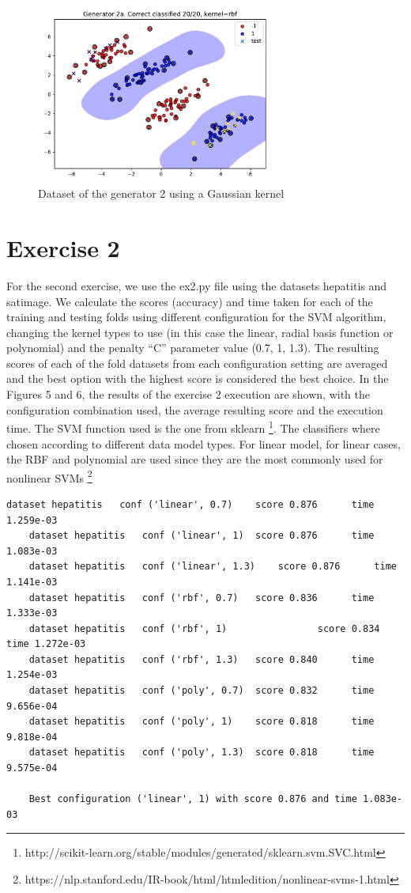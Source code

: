 \documentclass[12pt,a4paper]{article}
\begin{document}
\begin{figure}[h]
	\centering
	\includegraphics[width=0.7\textwidth]{ex1/2a.pdf}
	\caption{Dataset of the generator 2 using a Gaussian kernel}
	\label{fig:ex1gen2a}
\end{figure}
%

\section*{Exercise 2}

For the second exercise, we use the ex2.py file using the datasets hepatitis and satimage. 
We calculate the scores (accuracy) and time taken for each of the training and testing 
folds using different configuration for the SVM algorithm, changing the kernel types to use
(in this case the linear, radial basis function or polynomial) and the penalty “C” parameter
value (0.7, 1, 1.3). The resulting scores of each of the fold datasets from each configuration
setting are averaged and the best option with the highest score is considered the best choice.
In the Figures 5 and 6, the results of the exercise 2 execution are shown, with the
configuration combination used, the average resulting score and the execution time. The SVM
function used is the one from sklearn \footnote{http://scikit-learn.org/stable/modules/generated/sklearn.svm.SVC.html}. The classifiers where chosen according to different 
data model types. For linear model, for linear cases, the RBF and polynomial are used since 
they are the most commonly used for nonlinear SVMs \footnote{https://nlp.stanford.edu/IR-book/html/htmledition/nonlinear-svms-1.html}

\begin{lstlisting}[caption=Result of exercise 2 with hepatitis dataset]
	dataset hepatitis 	conf ('linear', 0.7) 	score 0.876 	 time 1.259e-03
	dataset hepatitis 	conf ('linear', 1) 	score 0.876 	 time 1.083e-03
	dataset hepatitis 	conf ('linear', 1.3) 	score 0.876 	 time 1.141e-03
	dataset hepatitis 	conf ('rbf', 0.7) 	score 0.836 	 time 1.333e-03
	dataset hepatitis 	conf ('rbf', 1) 	           score 0.834 	 time 1.272e-03
	dataset hepatitis 	conf ('rbf', 1.3) 	score 0.840 	 time 1.254e-03
	dataset hepatitis 	conf ('poly', 0.7) 	score 0.832 	 time 9.656e-04
	dataset hepatitis 	conf ('poly', 1) 	score 0.818 	 time 9.818e-04
	dataset hepatitis 	conf ('poly', 1.3) 	score 0.818 	 time 9.575e-04

	Best configuration ('linear', 1) with score 0.876 and time 1.083e-03	
\end{lstlisting}
\end{document}
